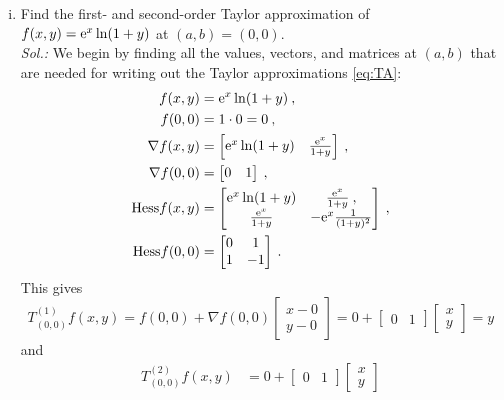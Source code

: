 \begin{example}
\begin{enumerate}[(i)]
	\item Find the first- and second-order Taylor approximation of $f(x,y)=\mathrm{e}^x \ln(1+y)$ at $(a,b)=(0,0)$. \\
	{\it Sol.:} We begin by finding all the values, vectors, and matrices at $(a,b)$ that are needed for writing out the Taylor approximations \eqref{eq:TA}:
	\begin{equation*}
	\begin{split}
	f(x,y) & = \mathrm{e}^x \ln(1+y) \:, \\
	f(0,0) & = 1 \cdot 0 = 0 \:, \\
	\nabla f(x,y) & = \begin{bmatrix} \mathrm{e}^x \ln(1+y) & \frac{\mathrm{e}^x}{1+y} \end{bmatrix} \:, \\
	\nabla f(0,0) & = \begin{bmatrix} 0 & 1 \end{bmatrix} \:, \\
	\mathrm{Hess}f(x,y) & = \begin{bmatrix} \mathrm{e}^x \ln(1+y) & \frac{\mathrm{e}^x}{1+y} \:, \\
								 \frac{\mathrm{e}^x}{1+y} & -\mathrm{e}^x\frac{1}{(1+y)^2} \end{bmatrix} \:, \\
	\mathrm{Hess}f(0,0) & = \begin{bmatrix}	0 & 1 \\ 1 & -1	\end{bmatrix} \:.
	\end{split}
	\end{equation*}
	This gives
	\begin{equation*}
	T^{(1)}_{(0,0)}f(x,y) = f(0,0)+\nabla f(0,0) 
	\begin{bmatrix}	x-0 \\ y-0 \end{bmatrix}
	= 0 + \begin{bmatrix} 0 & 1 \end{bmatrix} \begin{bmatrix} x \\ y \end{bmatrix} = y
	\end{equation*}
	and
	\begin{equation*}
	\begin{split}
	T^{(2)}_{(0,0)}f(x,y) 
	& = 0 + \begin{bmatrix} 0 & 1 \end{bmatrix} \begin{bmatrix} x \\ y \end{bmatrix}

\end{split}
\end{equation*}
\end{enumerate}
\end{example}

